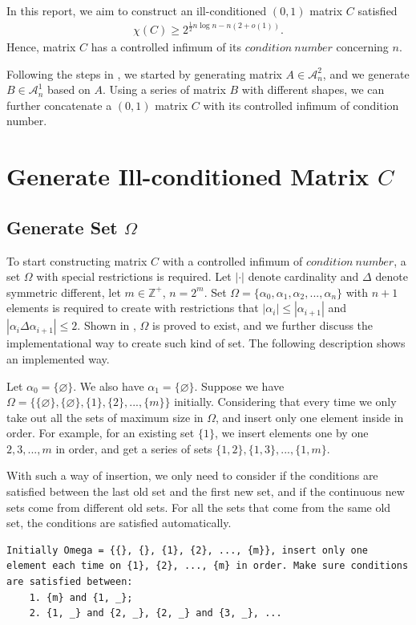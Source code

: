 \documentclass[11pt]{article}
\begin{document}
In this report, we aim to construct an ill-conditioned $(0, 1)$ matrix $C$ satisfied
\begin{align*}
\chi(C) \geq2^{\frac{1}{2}n\log n-n(2+o(1))}.
\end{align*}
Hence, matrix $C$ has a controlled infimum of its $condition\ number$ concerning $n$. 

Following the steps in \cite{ALON1997133}, we started by generating matrix $A \in \mathcal{A}_n^2$, and we generate $B \in \mathcal{A}_n^1$ based on $A$. Using a series of matrix $B$ with different shapes, we can further concatenate a $(0, 1)$ matrix $C$ with its controlled infimum of condition number.



\section{Generate Ill-conditioned Matrix $C$}


\subsection{Generate Set $\Omega$}
To start constructing matrix $C$ with a controlled infimum of $condition\ number$, a set $\Omega$ with special restrictions is required. Let $|\cdot|$ denote cardinality and $\Delta$ denote symmetric different, let $m\in \mathbb{Z}^{+}$, $n=2^m$. Set $\Omega = \{\alpha_0, \alpha_1, \alpha_2, ..., \alpha_n\}$ with $n + 1$ elements is required to create with restrictions that $|\alpha_i| \leq |\alpha_{i+1}|$ and $|\alpha_i \Delta \alpha_{i+1}| \leq 2$. Shown in \cite{doi:10.1137/S0895480192235878}, $\Omega$ is proved to exist, and we further discuss the implementational way to create such kind of set. The following description shows an implemented way.

Let $\alpha_0=\{\varnothing\}$. We also have $\alpha_1=\{\varnothing\}$. Suppose we have $\Omega = \{\{\varnothing\}, \{\varnothing\}, \{1\}, \{2\}, ..., \{m\}\}$ initially. Considering that every time we only take out all the sets of maximum size in $\Omega$, and insert only one element inside in order. For example, for an existing set $\{1\}$, we insert elements one by one $2, 3, ..., m$ in order, and get a series of sets $\{1, 2\}, \{1, 3\}, ..., \{1, m\}$.

With such a way of insertion, we only need to consider if the conditions are satisfied between the last old set and the first new set, and if the continuous new sets come from different old sets. For all the sets that come from the same old set, the conditions are satisfied automatically.
\begin{lstlisting}
Initially Omega = {{}, {}, {1}, {2}, ..., {m}}, insert only one element each time on {1}, {2}, ..., {m} in order. Make sure conditions are satisfied between:
    1. {m} and {1, _}; 
    2. {1, _} and {2, _}, {2, _} and {3, _}, ...
\end{lstlisting}
\end{document}
